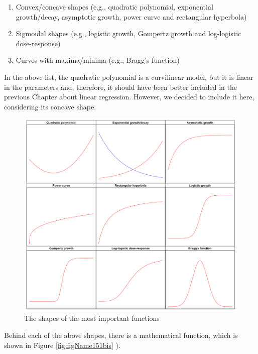 \documentclass[a4paper,12pt,oneside]{book}
\providecommand{\tightlist}{%
  \setlength{\itemsep}{0pt}\setlength{\parskip}{0pt}}
\begin{document}
\begin{enumerate}
\def\labelenumi{\arabic{enumi}.}
\tightlist
\item
  Convex/concave shapes (e.g., quadratic polynomial, exponential growth/decay, asymptotic growth, power curve and rectangular hyperbola)
\item
  Sigmoidal shapes (e.g., logistic growth, Gompertz growth and log-logistic dose-response)
\item
  Curves with maxima/minima (e.g., Bragg's function)
\end{enumerate}

In the above list, the quadratic polynomial is a curvilinear model, but it is linear in the parameters and, therefore, it should have been better included in the previous Chapter about linear regression. However, we decided to include it here, considering its concave shape.

\begin{figure}

{\centering \includegraphics[width=0.95\linewidth]{_images/nonLinearCurves} 

}

\caption{The shapes of the most important functions}\label{fig:figName151}
\end{figure}

Behind each of the above shapes, there is a mathematical function, which is shown in Figure \ref{fig:figName151bis} ).
\end{document}
